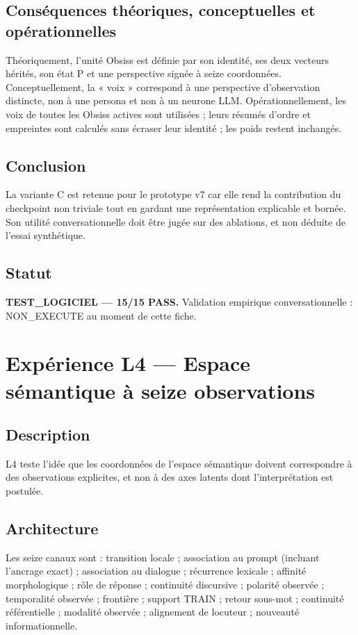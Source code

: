 \documentclass[11pt,a4paper]{report}
\begin{document}
\section{Conséquences théoriques, conceptuelles et opérationnelles}
Théoriquement, l'unité Obsiss est définie par son identité, ses deux vecteurs hérités, son état P et une perspective signée à seize coordonnées. Conceptuellement, la « voix » correspond à une perspective d'observation distincte, non à une persona et non à un neurone LLM. Opérationnellement, les voix de toutes les Obsiss actives sont utilisées ; leurs résumés d'ordre et empreintes sont calculés sans écraser leur identité ; les poids restent inchangés.
\section{Conclusion}
La variante C est retenue pour le prototype v7 car elle rend la contribution du checkpoint non triviale tout en gardant une représentation explicable et bornée. Son utilité conversationnelle doit être jugée sur des ablations, et non déduite de l'essai synthétique.
\section{Statut}
\begin{sloppypar}\textbf{TEST\_LOGICIEL — 15/15 PASS.} Validation empirique conversationnelle : NON\_EXECUTE au moment de cette fiche.\end{sloppypar}

\chapter[L4 — Sémantique]{Expérience L4 — Espace sémantique à seize observations}
\section{Description}
L4 teste l'idée que les coordonnées de l'espace sémantique doivent correspondre à des observations explicites, et non à des axes latents dont l'interprétation est postulée.
\section{Architecture}
Les seize canaux sont : transition locale ; association au prompt (incluant l'ancrage exact) ; association au dialogue ; récurrence lexicale ; affinité morphologique ; rôle de réponse ; continuité discursive ; polarité observée ; temporalité observée ; frontière ; support TRAIN ; retour sous-mot ; continuité référentielle ; modalité observée ; alignement de locuteur ; nouveauté informationnelle.
\end{document}
